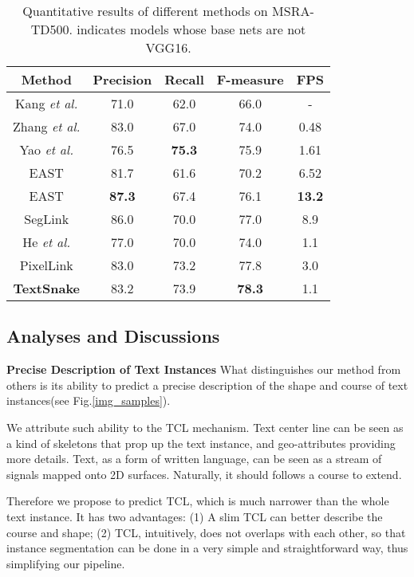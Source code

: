 \documentclass[runningheads]{llncs}
\begin{document}
\begin{table}
\small
\begin{centering}
\caption{Quantitative results of different methods on MSRA-TD500.  indicates models whose base nets are not VGG16.}  \label{tab_td500}
\begin{tabular}{|c|c|c|c|c|}
\hline 
\textbf{Method} & \textbf{Precision} & \textbf{Recall} & \textbf{F-measure} &\textbf{FPS} \tabularnewline
\hline 
\hline
Kang \emph{et al.} \cite{kang2014orientation} & 71.0 &  62.0 & 66.0 & -\tabularnewline
\hline
Zhang \emph{et al.} \cite{zhang2016multi} & 83.0 & 67.0 & 74.0 & 0.48\tabularnewline
\hline 
Yao \emph{et al.} \cite{yao2016scene} & 76.5  & \textbf{75.3}  & 75.9 &  1.61\tabularnewline
\hline 
EAST \cite{Zhou_2017_CVPR}  & 81.7  & 61.6 & 70.2 & 6.52 \tabularnewline
\hline 
EAST   \cite{Zhou_2017_CVPR} & \textbf{87.3}  & 67.4 & 76.1 & \textbf{13.2} \tabularnewline
\hline 
SegLink \cite{Shi_2017_CVPR} & 86.0  & 70.0 & 77.0 & 8.9 \tabularnewline
\hline 
He \emph{et al.}  \cite{He_2017_ICCV} & 77.0  &  70.0 & 74.0 & 1.1 \tabularnewline
\hline
PixelLink \cite{deng2018pixellink} & 83.0  & 73.2 & 77.8 & 3.0 \tabularnewline
\hline
\textbf{TextSnake} & 83.2 & 73.9 & \textbf{78.3} & 1.1 \tabularnewline
\hline \end{tabular}
\par\end{centering}
\vspace{-3mm}
\end{table}

\subsection{Analyses and Discussions}





\noindent\textbf{Precise Description of Text Instances} What distinguishes our method from others is its ability to predict a precise description of the shape and course of text instances(see Fig.\ref{img_samples}).

We attribute such ability to the TCL mechanism. Text center line can be seen as a kind of skeletons that prop up the text instance, and geo-attributes providing more details. Text, as a form of written language, can be seen as a stream of signals mapped onto 2D surfaces. Naturally, it should follows a course to extend. 


Therefore we propose to predict TCL, which is much narrower than the whole text instance. It has two advantages: (1) A slim TCL can better describe the course and shape; (2) TCL, intuitively, does not overlaps with each other, so that instance segmentation can be done in a very simple and straightforward way, thus simplifying our pipeline.
\end{document}
